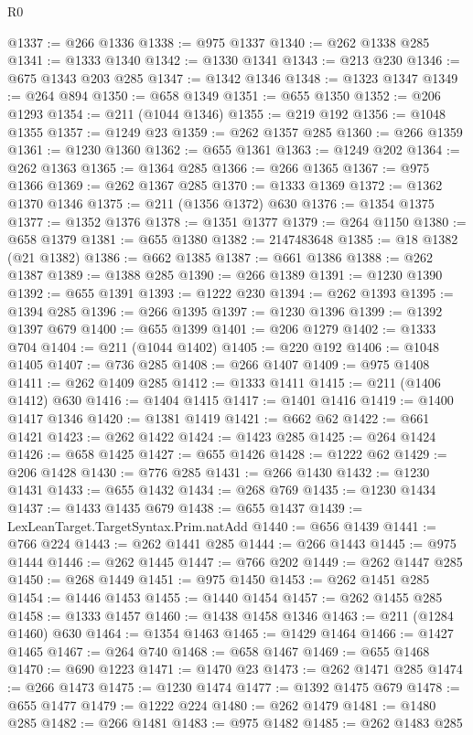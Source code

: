 \begin{lexlean}{R0}
\begin{coremodule}
@1337 := @266 @1336
@1338 := @975 @1337
@1340 := @262 @1338 @285
@1341 := @1333 @1340
@1342 := @1330 @1341
@1343 := @213 @230
@1346 := @675 @1343 @203 @285
@1347 := @1342 @1346
@1348 := @1323 @1347
@1349 := @264 @894
@1350 := @658 @1349
@1351 := @655 @1350
@1352 := @206 @1293
@1354 := @211 (@1044 @1346)
@1355 := @219 @192
@1356 := @1048 @1355
@1357 := @1249 @23
@1359 := @262 @1357 @285
@1360 := @266 @1359
@1361 := @1230 @1360
@1362 := @655 @1361
@1363 := @1249 @202
@1364 := @262 @1363
@1365 := @1364 @285
@1366 := @266 @1365
@1367 := @975 @1366
@1369 := @262 @1367 @285
@1370 := @1333 @1369
@1372 := @1362 @1370 @1346
@1375 := @211 (@1356 @1372) @630
@1376 := @1354 @1375
@1377 := @1352 @1376
@1378 := @1351 @1377
@1379 := @264 @1150
@1380 := @658 @1379
@1381 := @655 @1380
@1382 := 2147483648
@1385 := @18 @1382 (@21 @1382)
@1386 := @662 @1385
@1387 := @661 @1386
@1388 := @262 @1387
@1389 := @1388 @285
@1390 := @266 @1389
@1391 := @1230 @1390
@1392 := @655 @1391
@1393 := @1222 @230
@1394 := @262 @1393
@1395 := @1394 @285
@1396 := @266 @1395
@1397 := @1230 @1396
@1399 := @1392 @1397 @679
@1400 := @655 @1399
@1401 := @206 @1279
@1402 := @1333 @704
@1404 := @211 (@1044 @1402)
@1405 := @220 @192
@1406 := @1048 @1405
@1407 := @736 @285
@1408 := @266 @1407
@1409 := @975 @1408
@1411 := @262 @1409 @285
@1412 := @1333 @1411
@1415 := @211 (@1406 @1412) @630
@1416 := @1404 @1415
@1417 := @1401 @1416
@1419 := @1400 @1417 @1346
@1420 := @1381 @1419
@1421 := @662 @62
@1422 := @661 @1421
@1423 := @262 @1422
@1424 := @1423 @285
@1425 := @264 @1424
@1426 := @658 @1425
@1427 := @655 @1426
@1428 := @1222 @62
@1429 := @206 @1428
@1430 := @776 @285
@1431 := @266 @1430
@1432 := @1230 @1431
@1433 := @655 @1432
@1434 := @268 @769
@1435 := @1230 @1434
@1437 := @1433 @1435 @679
@1438 := @655 @1437
@1439 := LexLeanTarget.TargetSyntax.Prim.natAdd
@1440 := @656 @1439
@1441 := @766 @224
@1443 := @262 @1441 @285
@1444 := @266 @1443
@1445 := @975 @1444
@1446 := @262 @1445
@1447 := @766 @202
@1449 := @262 @1447 @285
@1450 := @268 @1449
@1451 := @975 @1450
@1453 := @262 @1451 @285
@1454 := @1446 @1453
@1455 := @1440 @1454
@1457 := @262 @1455 @285
@1458 := @1333 @1457
@1460 := @1438 @1458 @1346
@1463 := @211 (@1284 @1460) @630
@1464 := @1354 @1463
@1465 := @1429 @1464
@1466 := @1427 @1465
@1467 := @264 @740
@1468 := @658 @1467
@1469 := @655 @1468
@1470 := @690 @1223
@1471 := @1470 @23
@1473 := @262 @1471 @285
@1474 := @266 @1473
@1475 := @1230 @1474
@1477 := @1392 @1475 @679
@1478 := @655 @1477
@1479 := @1222 @224
@1480 := @262 @1479
@1481 := @1480 @285
@1482 := @266 @1481
@1483 := @975 @1482
@1485 := @262 @1483 @285

\end{coremodule}
\end{lexlean}
